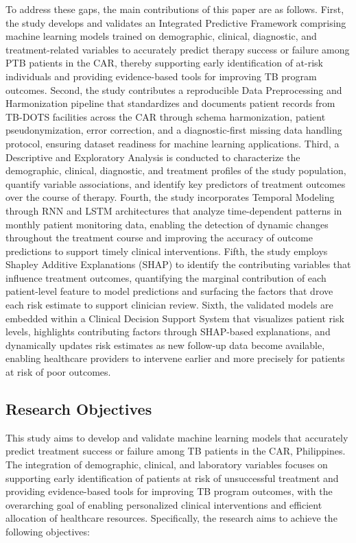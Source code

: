 \documentclass[12pt]{article}
\begin{document}
To address these gaps, the main contributions of this paper are as follows. First, the study develops and validates an Integrated Predictive Framework comprising machine learning models trained on demographic, clinical, diagnostic, and treatment-related variables to accurately predict therapy success or failure among PTB patients in the CAR, thereby supporting early identification of at-risk individuals and providing evidence-based tools for improving TB program outcomes. Second, the study contributes a reproducible Data Preprocessing and Harmonization pipeline that standardizes and documents patient records from TB-DOTS facilities across the CAR through schema harmonization, patient pseudonymization, error correction, and a diagnostic-first missing data handling protocol, ensuring dataset readiness for machine learning applications. Third, a Descriptive and Exploratory Analysis is conducted to characterize the demographic, clinical, diagnostic, and treatment profiles of the study population, quantify variable associations, and identify key predictors of treatment outcomes over the course of therapy. Fourth, the study incorporates Temporal Modeling through RNN and LSTM architectures that analyze time-dependent patterns in monthly patient monitoring data, enabling the detection of dynamic changes throughout the treatment course and improving the accuracy of outcome predictions to support timely clinical interventions. Fifth, the study employs Shapley Additive Explanations (SHAP) to identify the contributing variables that influence treatment outcomes, quantifying the marginal contribution of each patient-level feature to model predictions and surfacing the factors that drove each risk estimate to support clinician review. Sixth, the validated models are embedded within a Clinical Decision Support System that visualizes patient risk levels, highlights contributing factors through SHAP-based explanations, and dynamically updates risk estimates as new follow-up data become available, enabling healthcare providers to intervene earlier and more precisely for patients at risk of poor outcomes.

\subsection{Research Objectives}

This study aims to develop and validate machine learning models that accurately predict treatment success or failure among TB patients in the CAR, Philippines. The integration of demographic, clinical, and laboratory variables focuses on supporting early identification of patients at risk of unsuccessful treatment and providing evidence-based tools for improving TB program outcomes, with the overarching goal of enabling personalized clinical interventions and efficient allocation of healthcare resources. Specifically, the research aims to achieve the following objectives:
\end{document}
